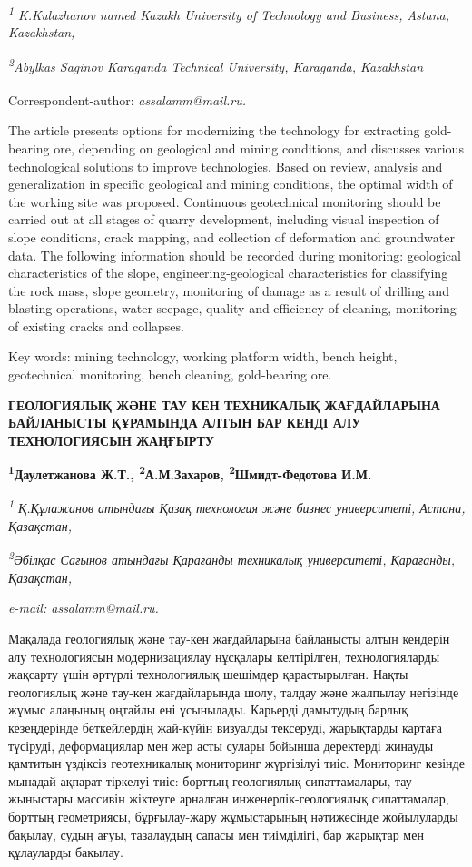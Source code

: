 \emph{\textsuperscript{1} K.Kulazhanov named Kazakh University of
Technology and Business, Astana, Kazakhstan,}

\emph{\textsuperscript{2}Abylkas Saginov Karaganda Technical University,
Karaganda, Kazakhstan}

{\bfseries \textsuperscript{\envelope }}Correspondent-author:
\emph{assalamm@mail.ru.}

The article presents options for modernizing the technology for
extracting gold-bearing ore, depending on geological and mining
conditions, and discusses various technological solutions to improve
technologies. Based on review, analysis and generalization in specific
geological and mining conditions, the optimal width of the working site
was proposed. Continuous geotechnical monitoring should be carried out
at all stages of quarry development, including visual inspection of
slope conditions, crack mapping, and collection of deformation and
groundwater data. The following information should be recorded during
monitoring: geological characteristics of the slope,
engineering-geological characteristics for classifying the rock mass,
slope geometry, monitoring of damage as a result of drilling and
blasting operations, water seepage, quality and efficiency of cleaning,
monitoring of existing cracks and collapses.

Key words: mining technology, working platform width, bench height,
geotechnical monitoring, bench cleaning, gold-bearing ore.

{\bfseries ГЕОЛОГИЯЛЫҚ ЖӘНЕ ТАУ КЕН ТЕХНИКАЛЫҚ ЖАҒДАЙЛАРЫНА БАЙЛАНЫСТЫ
ҚҰРАМЫНДА АЛТЫН БАР КЕНДІ АЛУ ТЕХНОЛОГИЯСЫН ЖАҢҒЫРТУ}

{\bfseries \textsuperscript{1}Даулетжанова Ж.Т.,
\textsuperscript{2}А.М.Захаров\textsuperscript{\envelope },
\textsuperscript{2}Шмидт-Федотова И.М.}

\emph{\textsuperscript{1} Қ.Құлажанов атындағы Қазақ технология және
бизнес университеті, Астана, Қазақстан,}

\emph{\textsuperscript{2}Әбілқас Сағынов атындағы Қарағанды техникалық
университеті, Қарағанды, Қазақстан,}

\emph{e-mail: assalamm@mail.ru.}

Мақалада геологиялық және тау-кен жағдайларына байланысты алтын кендерін
алу технологиясын модернизациялау нұсқалары келтірілген, технологияларды
жақсарту үшін әртүрлі технологиялық шешімдер қарастырылған. Нақты
геологиялық және тау-кен жағдайларында шолу, талдау және жалпылау
негізінде жұмыс алаңының оңтайлы ені ұсынылады. Карьерді дамытудың
барлық кезеңдерінде беткейлердің жай-күйін визуалды тексеруді,
жарықтарды картаға түсіруді, деформациялар мен жер асты сулары бойынша
деректерді жинауды қамтитын үздіксіз геотехникалық мониторинг жүргізілуі
тиіс. Мониторинг кезінде мынадай ақпарат тіркелуі тиіс: борттың
геологиялық сипаттамалары, тау жыныстары массивін жіктеуге арналған
инженерлік-геологиялық сипаттамалар, борттың геометриясы, бұрғылау-жару
жұмыстарының нәтижесінде жойылуларды бақылау, судың ағуы, тазалаудың
сапасы мен тиімділігі, бар жарықтар мен құлауларды бақылау.

